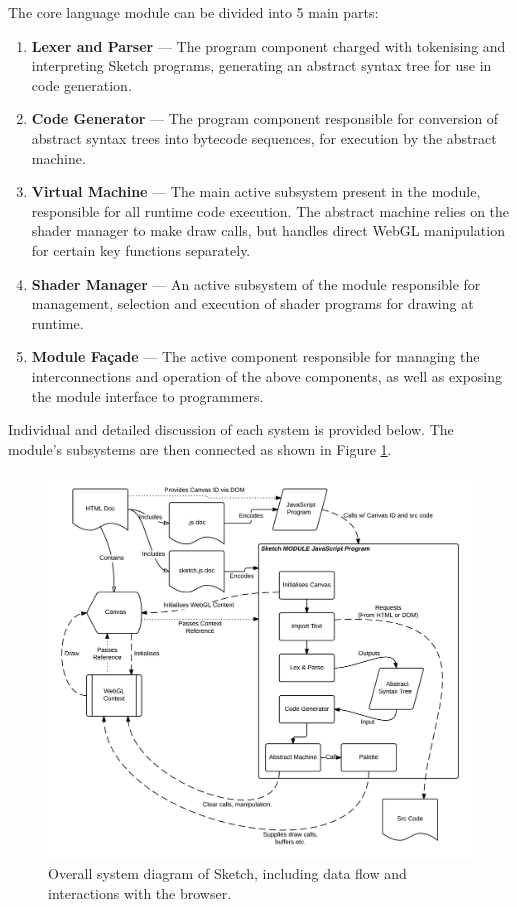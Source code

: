 \documentclass{l3proj}
\begin{document}
The core language module can be divided into 5 main parts:
\begin{enumerate}
\item \textbf{Lexer and Parser} --- The program component charged with tokenising and interpreting Sketch programs, generating an abstract syntax tree for use in code generation.
\item \textbf{Code Generator} --- The program component responsible for conversion of abstract syntax trees into bytecode sequences, for execution by the abstract machine.
\item \textbf{Virtual Machine} --- The main active subsystem present in the module, responsible for all runtime code execution. The abstract machine relies on the shader manager to make draw calls, but handles direct WebGL manipulation for certain key functions separately.
\item \textbf{Shader Manager} --- An active subsystem of the module responsible for management, selection and execution of shader programs for drawing at runtime.
\item \textbf{Module Fa\c{c}ade} --- The active component responsible for managing the interconnections and operation of the above components, as well as exposing the module interface to programmers.
\end{enumerate}
Individual and detailed discussion of each system is provided below. The module's subsystems are then connected as shown in Figure \ref{fig:sketch-overall}.
\begin{figure}[!h]
\centering
\includegraphics[width=\textwidth]{images/sys-diag}
\caption{Overall system diagram of Sketch, including data flow and interactions with the browser.}
\label{fig:sketch-overall}
\end{figure}
\end{document}
